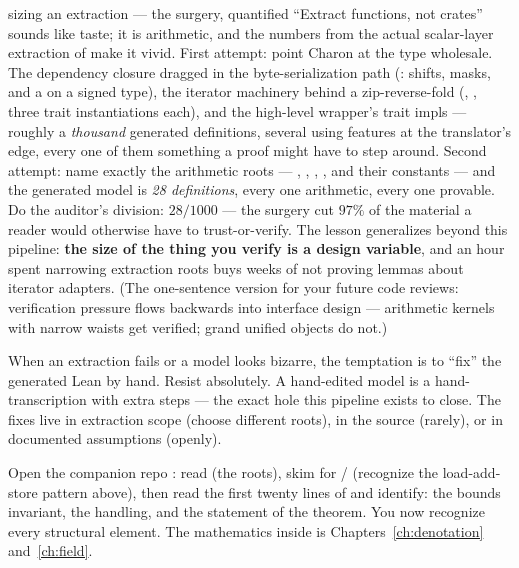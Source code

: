 \begin{worked}{sizing an extraction --- the surgery, quantified}
``Extract functions, not crates'' sounds like taste; it is arithmetic,
and the numbers from the actual scalar-layer extraction of
 make it vivid. First attempt: point Charon
at the  type wholesale. The dependency closure dragged in
the byte-serialization path (: shifts, masks, and a
 on a signed type), the iterator machinery behind a
zip-reverse-fold (, , three trait
instantiations each), and the high-level wrapper's trait impls ---
roughly a \emph{thousand} generated definitions, several using features
at the translator's edge, every one of them something a proof might have
to step around. Second attempt: name exactly the arithmetic roots ---
, , ,
, and their constants --- and the generated
model is \emph{28 definitions}, every one arithmetic, every one
provable. Do the auditor's division: $28/1000$ --- the surgery cut
$97\%$ of the material a reader would otherwise have to trust-or-verify.
The lesson generalizes beyond this pipeline: \textbf{the size of the
thing you verify is a design variable}, and an hour spent narrowing
extraction roots buys weeks of not proving lemmas about iterator
adapters. (The one-sentence version for your future code reviews:
verification pressure flows backwards into interface design ---
arithmetic kernels with narrow waists get verified; grand unified
objects do not.)
\end{worked}

\begin{pitfall}
When an extraction fails or a model looks bizarre, the temptation is to
``fix'' the generated Lean by hand. Resist absolutely. A hand-edited model
is a hand-transcription with extra steps --- the exact hole this pipeline
exists to close. The fixes live in extraction scope (choose different
roots), in the source (rarely), or in documented assumptions (openly).
\end{pitfall}

\begin{tryit}
Open the companion repo : read
 (the roots), skim  for
/ (recognize the load-add-store pattern above), then
read the first twenty lines of 
and identify: the bounds invariant, the  handling, and the
statement of the theorem. You now recognize every structural element. The
mathematics inside is Chapters~\ref{ch:denotation} and~\ref{ch:field}.
\end{tryit}

